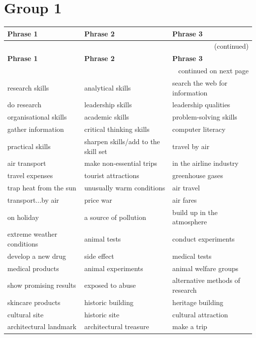 \documentclass[10pt,a4paper]{article}
\begin{document}
\section*{Group 1}

\setlength{\tabcolsep}{8pt}
\renewcommand{\arraystretch}{1.3}
{\large
\begin{longtable}{@{}*{3}{p{}}@{}}
\toprule
\textbf{Phrase 1} & \textbf{Phrase 2} & \textbf{Phrase 3} \\ \midrule
\endfirsthead
\multicolumn{3}{r}{\footnotesize (continued)} \\
\toprule
\textbf{Phrase 1} & \textbf{Phrase 2} & \textbf{Phrase 3} \\ \midrule
\endhead
\midrule
\multicolumn{3}{r}{\footnotesize continued on next page} \\
\endfoot
\bottomrule
\endlastfoot
research skills & analytical skills & search the web for information \\
do research & leadership skills & leadership qualities \\
organisational skills & academic skills & problem-solving skills \\
gather information & critical thinking skills & computer literacy \\
practical skills & sharpen skills/add to the skill set & travel by air \\
air transport & make non-essential trips & in the airline industry \\
travel expenses & tourist attractions & greenhouse gases \\
trap heat from the sun & unusually warm conditions & air travel \\
transport...by air & price war & air fares \\
on holiday & a source of pollution & build up in the atmosphere \\
extreme weather conditions & animal tests & conduct experiments \\
develop a new drug & side effect & medical tests \\
medical products & animal experiments & animal welfare groups \\
show promising results & exposed to abuse & alternative methods of research \\
skincare products & historic building & heritage building \\
cultural site & historic site & cultural attraction \\
architectural landmark & architectural treasure & make a trip \\

\end{longtable}}
\end{document}
